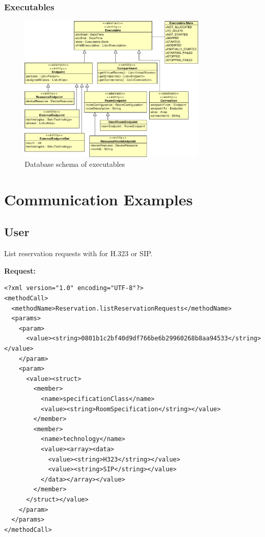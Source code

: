 \subsection{Executables}

\begin{figure}[ht!]
\centering\includegraphics[width=0.8\textwidth]{diagrams/cd_executables}
\caption{Database schema of executables}
\label{fig:executables}
\end{figure}



\chapter{Communication Examples} 

\section{User}

List reservation requests with  for H.323 or SIP.

\noindent\textbf{Request:}
{\scriptsize\begin{verbatim}
<?xml version="1.0" encoding="UTF-8"?>
<methodCall>
  <methodName>Reservation.listReservationRequests</methodName>
  <params>
    <param>
      <value><string>0801b1c2bf40d9df766be6b29960268b8aa94533</string></value>
    </param>
    <param>
      <value><struct>
        <member>
          <name>specificationClass</name>
          <value><string>RoomSpecification</string></value>
        </member>
        <member>
          <name>technology</name>
          <value><array><data>
            <value><string>H323</string></value>
            <value><string>SIP</string></value>
          </data></array></value>
        </member>
      </struct></value>
    </param>
  </params>
</methodCall>
\end{verbatim}}

